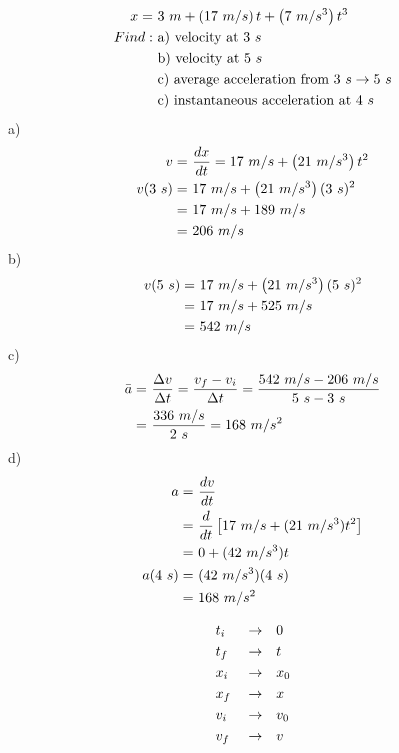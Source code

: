 	\begin{align}
		x = \ &3 \ m + \left( 17 \ m/s \right)t + \left(7 \ m/s^{3} \right)t^{3}& \notag \\
		Find: \ &\text{a) velocity at }3 \ s& \notag \\
		&\text{b) velocity at }5 \ s& \notag \\
		&\text{c) average acceleration from }3 \ s \to 5 \ s& \notag \\
		&\text{c) instantaneous acceleration at }4 \ s& \notag
	\end{align}
	a)
	\begin{align}
		v = \ &\frac{dx}{dt} = 17 \ m/s + \left( 21 \ m/s^{3} \right)t^{2}& \notag \\
		v(3 \ s) = \ &17 \ m/s + \left( 21 \ m/s^{3} \right)(3 \ s)^{2}& \notag \\
		= \ &17 \ m/s + 189 \ m/s& \notag \\
		= \ &206 \ m/s& \notag
	\end{align}
	b)
	\begin{align}
		v(5 \ s) = \ &17 \ m/s + \left( 21 \ m/s^{3} \right)(5 \ s)^{2}& \notag \\
		= \ &17 \ m/s + 525 \ m/s& \notag \\
		= \ &542 \ m/s& \notag
	\end{align}
	c)
	\begin{align}
		\bar{a} = \ &\frac{\Delta v}{\Delta t} = \frac{v_{f} - v_{i}}{\Delta t} = \frac{542 \ m/s - 206 \ m/s}{5 \ s - 3 \ s}& \notag \\
		= \ &\frac{336 \ m/s}{2 \ s} = 168 \ m/s^{2}& \notag
	\end{align}
	d)
	\begin{align}
		a = \ &\frac{dv}{dt}& \notag \\
		= \ &\frac{d}{dt}\left[ 17 \ m/s + (21 \ m/s^{3})t^{2} \right]& \notag \\
		= \ &0 + (42 \ m/s^{3})t& \notag \\
		a(4 \ s) = \ &(42 \ m/s^{3})(4 \ s)& \notag \\
		= \ &168 \ m/s^{2}& \notag
	\end{align}

	\begin{align}
		&t_{i}& &\to& &0& \notag \\
		&t_{f}& &\to& &t& \notag \\
		&x_{i}& &\to& &x_{0}& \notag \\
		&x_{f}& &\to& &x& \notag \\
		&v_{i}& &\to& &v_{0}& \notag \\
		&v_{f}& &\to& &v& \notag
	\end{align}

